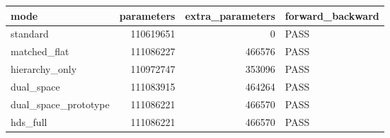 \begin{tabular}{lrrl}
\toprule
mode & parameters & extra\_parameters & forward\_backward \\
\midrule
standard & 110619651 & 0 & PASS \\
matched\_flat & 111086227 & 466576 & PASS \\
hierarchy\_only & 110972747 & 353096 & PASS \\
dual\_space & 111083915 & 464264 & PASS \\
dual\_space\_prototype & 111086221 & 466570 & PASS \\
hds\_full & 111086221 & 466570 & PASS \\
\bottomrule
\end{tabular}
